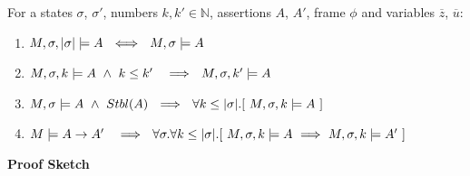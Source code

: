  
\begin{lemma}
\label{l:shallow:scoped}
For a states $\sigma$, $\sigma'$, numbers $k,k'\in \mathbb{N}$, assertions  $A$, $A'$, frame $\phi$ and variables $\overline z$, $\overline u$:
\begin{enumerate}
\item
$ \satDAssertFrom M  \sigma { \DepthSt \sigma}   A \ \ \Longleftrightarrow\ \ M,\sigma \models A\ $
\item
$ \satDAssertFrom M  \sigma {k} A \ \wedge\  k\leq k'\  \  \   \Longrightarrow \ \ \satDAssertFrom M  \sigma {k'} A$ 
\item 
\label{shallow:to:scoped}
$ M,\sigma \models A \ \wedge\ \Stable A \  \ \Longrightarrow \  \  \forall k  \leq  \DepthSt \sigma.[ \ \satDAssertFrom M  \sigma k   A \ ]$
\item
\label{fourSD}
$ M  \models A \rightarrow A'\  \  \   \Longrightarrow \ \ \forall \sigma. \forall k\leq  { \DepthSt \sigma}.[ \ \satDAssertFrom M  \sigma {k} A
\ \Longrightarrow \  \satDAssertFrom M  \sigma {k} A'\ ]$

\end{enumerate}
\end{lemma}
 
 


  
\noindent
\vspace{.1cm}
{\textbf{Proof Sketch}} 


